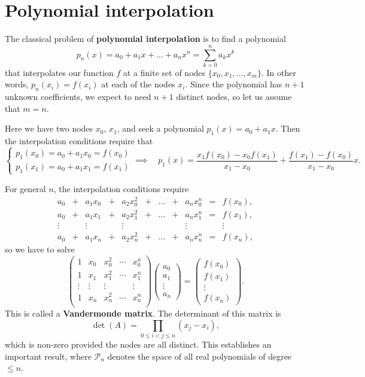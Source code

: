 \documentclass[
  letterpaper,
  DIV=11,
  numbers=noendperiod]{scrreprt}
\begin{document}
\section{Polynomial interpolation}\label{polynomial-interpolation}

The classical problem of \textbf{polynomial interpolation} is to find a
polynomial \[
p_n(x) = a_0 + a_1x + \ldots + a_n x^n = \sum_{k=0}^n a_k x^k
\] that interpolates our function \(f\) at a finite set of nodes
\(\{x_0, x_1, \ldots, x_m\}\). In other words, \(p_n(x_i)=f(x_i)\) at
each of the nodes \(x_i\). Since the polynomial has \(n+1\) unknown
coefficients, we expect to need \(n+1\) distinct nodes, so let us assume
that \(m=n\).

Here we have two nodes \(x_0\), \(x_1\), and seek a polynomial
\(p_1(x) = a_0 + a_1x\). Then the interpolation conditions require that
\[
\begin{cases}
p_1(x_0) = a_0 + a_1x_0 = f(x_0)\\
p_1(x_1) = a_0 + a_1x_1 = f(x_1)
\end{cases}
\implies\quad
p_1(x) = \frac{x_1f(x_0) - x_0f(x_1)}{x_1 - x_0} + \frac{f(x_1) - f(x_0)}{x_1 - x_0}x.
\]

For general \(n\), the interpolation conditions require \[
\begin{matrix*}
a_0 &+& a_1x_0 &+& a_2x_0^2 &+& \ldots &+& a_nx_0^n &=& f(x_0),\\
a_0 &+& a_1x_1 &+& a_2x_1^2 &+& \ldots &+& a_nx_1^n &=& f(x_1),\\
\vdots  && \vdots  && \vdots     &&        &&\vdots      && \vdots\\
a_0 &+& a_1x_n &+& a_2x_n^2 &+& \ldots &+& a_nx_n^n &=& f(x_n),
\end{matrix*}
\] so we have to solve \[
\begin{pmatrix}
1 & x_0 & x_0^2 & \cdots & x_0^n\\
1 & x_1 & x_1^2 & \cdots & x_1^n\\
\vdots & \vdots &\vdots& & \vdots\\
1 & x_n & x_n^2 & \cdots & x_n^n\\
\end{pmatrix}
\begin{pmatrix}
a_0\\ a_1\\ \vdots\\ a_n
\end{pmatrix}
=
\begin{pmatrix}
f(x_0)\\ f(x_1)\\ \vdots\\ f(x_n)
\end{pmatrix}.
\] This is called a \textbf{Vandermonde matrix}. The determinant of this
matrix is \[
\det(A) = \prod_{0\leq i < j\leq n} (x_j - x_i),
\] which is non-zero provided the nodes are all distinct. This
establishes an important result, where \(\mathcal{P}_n\) denotes the
space of all real polynomials of degree \(\leq n\).
\end{document}
